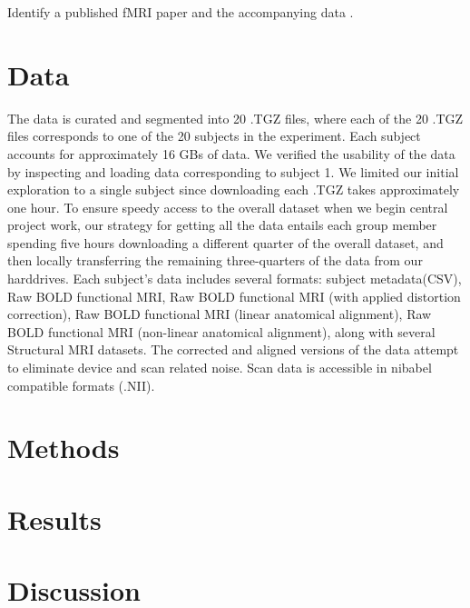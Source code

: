\documentclass[11pt]{article}
\begin{document}
Identify a published fMRI paper and the accompanying data
\cite{lindquist2008statistical}.

\section{Data}
The data is curated and segmented into 20 .TGZ files, where each of the 20 .TGZ 
files corresponds to one of the 20 subjects in the experiment. Each subject 
accounts for approximately 16 GBs of data. We verified the usability of the data
by inspecting and loading data corresponding to subject 1. We limited our 
initial exploration to a single subject since downloading each .TGZ takes 
approximately one hour. To ensure speedy access to the overall dataset when we 
begin central project work, our strategy for getting all the data entails each 
group member spending five hours downloading a different quarter of the overall
dataset, and then locally transferring the remaining three-quarters of the data
from our harddrives. Each subject's data includes several formats: subject
metadata(CSV), Raw BOLD functional MRI, Raw BOLD functional MRI 
(with applied distortion correction), Raw BOLD functional MRI (linear anatomical
alignment), Raw BOLD functional MRI (non-linear anatomical alignment), along 
with several Structural MRI datasets. The corrected and aligned versions of the
data attempt to eliminate device and scan related noise. Scan data is 
accessible in nibabel compatible formats (.NII).

\section{Methods}
\section{Results}
\section{Discussion}



\end{document}
